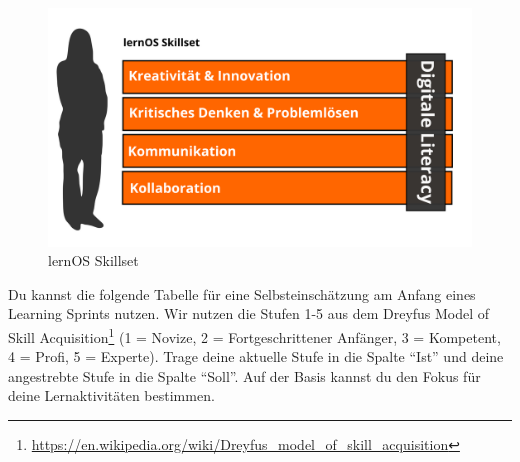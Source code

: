 \documentclass[
  ngerman,
  paper=a4,
,captions=tableheading
]{scrartcl}
\DeclareRobustCommand{\href}[2]{#2\footnote{\url{#1}}}
\begin{document}
\begin{figure}
\centering
\includegraphics{./tex2pdf.-af94b87e0fdb9aa6/0b6da1ca1544dc3dc47d47c304963015ed6dcf34.png}
\caption{lernOS Skillset}
\end{figure}

Du kannst die folgende Tabelle für eine Selbsteinschätzung am Anfang
eines Learning Sprints nutzen. Wir nutzen die Stufen 1-5 aus dem
\href{https://en.wikipedia.org/wiki/Dreyfus_model_of_skill_acquisition}{Dreyfus
Model of Skill Acquisition} (1 = Novize, 2 = Fortgeschrittener Anfänger,
3 = Kompetent, 4 = Profi, 5 = Experte). Trage deine aktuelle Stufe in
die Spalte ``Ist'' und deine angestrebte Stufe in die Spalte ``Soll''.
Auf der Basis kannst du den Fokus für deine Lernaktivitäten bestimmen.
\end{document}
